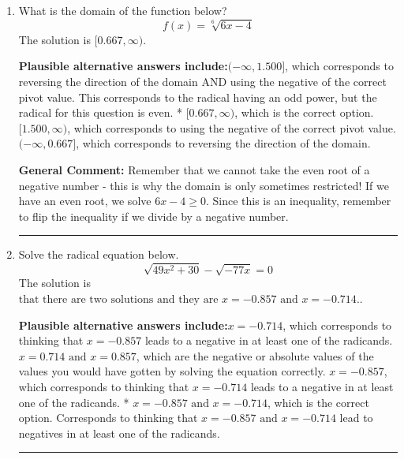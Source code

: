 \documentclass{extbook}[14pt]
\newcommand{\litem}[1]{\item #1

\rule{\textwidth}{0.4pt}}
\begin{document}
\begin{enumerate}\litem{
What is the domain of the function below?
\[ f(x) = \sqrt[6]{6 x - 4} \]The solution is \( [0.667, \infty) \).\begin{enumerate}[label=\Alph*.]
\textbf{Plausible alternative answers include:}$(-\infty, 1.500]$, which corresponds to reversing the direction of the domain AND using the negative of the correct pivot value.
This corresponds to the radical having an odd power, but the radical for this question is even.
* $[0.667, \infty)$, which is the correct option.
$[1.500, \infty)$, which corresponds to using the negative of the correct pivot value.
 $(-\infty, 0.667]$, which corresponds to reversing the direction of the domain.
\end{enumerate}

\textbf{General Comment:} Remember that we cannot take the even root of a negative number - this is why the domain is only sometimes restricted! If we have an even root, we solve $6 x - 4 \geq 0$. Since this is an inequality, remember to flip the inequality if we divide by a negative number.
}
\litem{
Solve the radical equation below.
\[ \sqrt{49 x^2 + 30} - \sqrt{-77 x} = 0 \]The solution is \( \text{that there are two solutions and they are } x = -0.857 \text{ and } x = -0.714. \).\begin{enumerate}[label=\Alph*.]
\textbf{Plausible alternative answers include:}$x = -0.714$, which corresponds to thinking that $x = -0.857$ leads to a negative in at least one of the radicands.
$x = 0.714 \text{ and } x = 0.857$, which are the negative or absolute values of the values you would have gotten by solving the equation correctly.
$x = -0.857$, which corresponds to thinking that $x = -0.714$ leads to a negative in at least one of the radicands.
* $x = -0.857 \text{ and } x = -0.714$, which is the correct option.
Corresponds to thinking that $x = -0.857 \text{ and } x = -0.714$ lead to negatives in at least one of the radicands.
\end{enumerate}

}
\end{enumerate}
\end{document}
